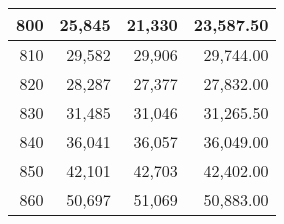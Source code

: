 \begin{longtable}{|r|r|r|r|}
		800                                                                                                                   & 25,845                                               & 21,330                                               & 23,587.50                                                                                                              \\ \hline
		810                                                                                                                   & 29,582                                               & 29,906                                               & 29,744.00                                                                                                              \\ \hline
		820                                                                                                                   & 28,287                                               & 27,377                                               & 27,832.00                                                                                                              \\ \hline
		830                                                                                                                   & 31,485                                               & 31,046                                               & 31,265.50                                                                                                              \\ \hline
		840                                                                                                                   & 36,041                                               & 36,057                                               & 36,049.00                                                                                                              \\ \hline
		850                                                                                                                   & 42,101                                               & 42,703                                               & 42,402.00                                                                                                              \\ \hline
		860                                                                                                                   & 50,697                                               & 51,069                                               & 50,883.00                                                                                                              \\ \hline

\end{longtable}
